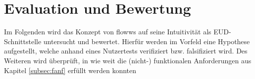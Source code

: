 \chapter{Evaluation und Bewertung}
Im Folgenden wird das Konzept von flowws auf seine Intuitivität als \ac{EUD}-Schnitt\-stel\-le untersucht und bewertet. Hierfür werden im Vorfeld eine Hypothese aufgestellt, welche anhand eines Nutzertests verifiziert bzw. falsifiziert wird. Des Weiteren wird überprüft, in wie weit die (nicht-) funktionalen Anforderungen aus Kapitel \ref{subsec:fanf} erfüllt werden konnten








